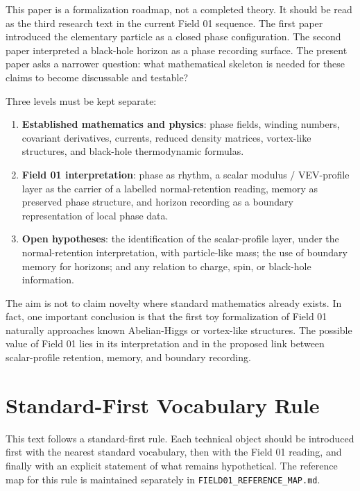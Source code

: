 \documentclass[11pt,a4paper]{article}
\begin{document}
This paper is a formalization roadmap, not a completed theory. It should be read as the third research text in the current Field 01 sequence. The first paper introduced the elementary particle as a closed phase configuration. The second paper interpreted a black-hole horizon as a phase recording surface. The present paper asks a narrower question: what mathematical skeleton is needed for these claims to become discussable and testable?

Three levels must be kept separate:
\begin{enumerate}
\item \textbf{Established mathematics and physics}: phase fields, winding numbers, covariant derivatives, currents, reduced density matrices, vortex-like structures, and black-hole thermodynamic formulas.
\item \textbf{Field 01 interpretation}: phase as rhythm, a scalar modulus / VEV-profile layer as the carrier of a labelled normal-retention reading, memory as preserved phase structure, and horizon recording as a boundary representation of local phase data.
\item \textbf{Open hypotheses}: the identification of the scalar-profile layer, under the normal-retention interpretation, with particle-like mass; the use of boundary memory for horizons; and any relation to charge, spin, or black-hole information.
\end{enumerate}

The aim is not to claim novelty where standard mathematics already exists. In fact, one important conclusion is that the first toy formalization of Field 01 naturally approaches known Abelian-Higgs or vortex-like structures. The possible value of Field 01 lies in its interpretation and in the proposed link between scalar-profile retention, memory, and boundary recording.

\section{Standard-First Vocabulary Rule}

This text follows a standard-first rule. Each technical object should be introduced first with the nearest standard vocabulary, then with the Field 01 reading, and finally with an explicit statement of what remains hypothetical. The reference map for this rule is maintained separately in \texttt{FIELD01\_REFERENCE\_MAP.md}.
\end{document}
